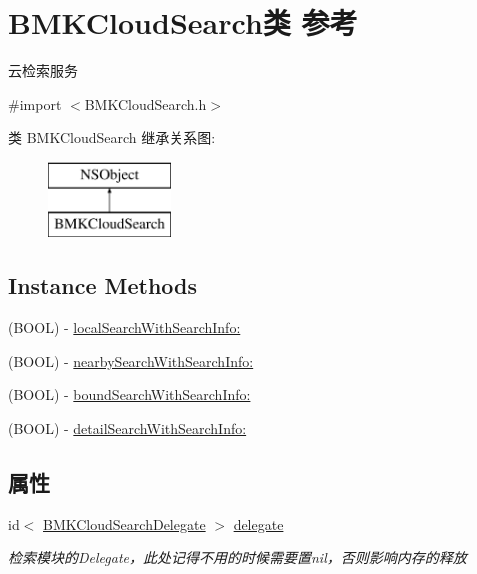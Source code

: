\hypertarget{interface_b_m_k_cloud_search}{\section{B\+M\+K\+Cloud\+Search类 参考}
\label{interface_b_m_k_cloud_search}
}


云检索服务  




{\ttfamily \#import $<$B\+M\+K\+Cloud\+Search.\+h$>$}

类 B\+M\+K\+Cloud\+Search 继承关系图\+:\begin{figure}[H]
\begin{center}
\leavevmode
\includegraphics[height=2.000000cm]{interface_b_m_k_cloud_search}
\end{center}
\end{figure}
\subsection*{Instance Methods}
\begin{DoxyCompactItemize}
\item 
(B\+O\+O\+L) -\/ \hyperlink{interface_b_m_k_cloud_search_a473c4aeff275be5840ac6cf8010ce1d8}{local\+Search\+With\+Search\+Info\+:}
\item 
(B\+O\+O\+L) -\/ \hyperlink{interface_b_m_k_cloud_search_abe65e1b2f2b67e1d081c697caae80e4b}{nearby\+Search\+With\+Search\+Info\+:}
\item 
(B\+O\+O\+L) -\/ \hyperlink{interface_b_m_k_cloud_search_a7b2a5b409e884fb240e94f42cbad5208}{bound\+Search\+With\+Search\+Info\+:}
\item 
(B\+O\+O\+L) -\/ \hyperlink{interface_b_m_k_cloud_search_aaa7dcb1e49edd705290a3e79d8d22e92}{detail\+Search\+With\+Search\+Info\+:}
\end{DoxyCompactItemize}
\subsection*{属性}
\begin{DoxyCompactItemize}
\item 
\hypertarget{interface_b_m_k_cloud_search_ac35ac10ba735ab371814e2d69c27af23}{id$<$ \hyperlink{protocol_b_m_k_cloud_search_delegate-p}{B\+M\+K\+Cloud\+Search\+Delegate} $>$ \hyperlink{interface_b_m_k_cloud_search_ac35ac10ba735ab371814e2d69c27af23}{delegate}}\label{interface_b_m_k_cloud_search_ac35ac10ba735ab371814e2d69c27af23}

\begin{DoxyCompactList}\small\item\em 检索模块的\+Delegate，此处记得不用的时候需要置nil，否则影响内存的释放 \end{DoxyCompactList}\end{DoxyCompactItemize}


